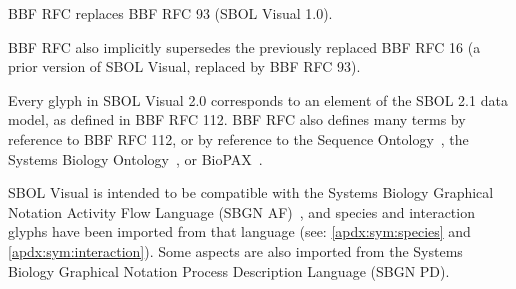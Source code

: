 
BBF RFC \rfcnum{} replaces BBF RFC 93 (SBOL Visual 1.0).

BBF RFC \rfcnum{} also implicitly supersedes the previously replaced BBF RFC 16 (a prior version of SBOL Visual, replaced by BBF RFC 93).


Every glyph in SBOL Visual 2.0 corresponds to an element of the SBOL 2.1 data model, as defined in BBF RFC 112.
BBF RFC \rfcnum{} also defines many terms by reference to BBF RFC 112, 
or by reference to the Sequence Ontology~\citep{SequenceOntology},
the Systems Biology Ontology~\citep{SBO},
or BioPAX~\citep{BioPAX}.


SBOL Visual is intended to be compatible with the Systems Biology Graphical Notation Activity Flow Language (SBGN AF)~\citep{sbgn}, 
and species and interaction glyphs have been imported from that language (see: \ref{apdx:sym:species} and \ref{apdx:sym:interaction}).
Some aspects are also imported from the Systems Biology Graphical Notation Process Description Language (SBGN PD).